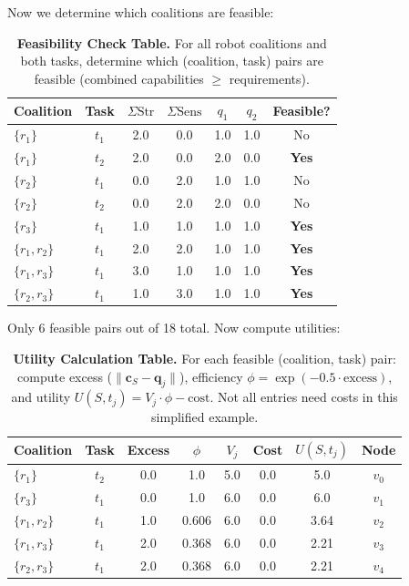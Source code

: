 Now we determine which coalitions are feasible:

\begin{table}[H]
\centering
\begin{tabular}{lcccccc}
\toprule
\textbf{Coalition} & \textbf{Task} & $\Sigma \text{Str}$ & $\Sigma \text{Sens}$ & $q_1$ & $q_2$ & \textbf{Feasible?} \\
\midrule
$\{r_1\}$ & $t_1$ & 2.0 & 0.0 & 1.0 & 1.0 & No \\
$\{r_1\}$ & $t_2$ & 2.0 & 0.0 & 2.0 & 0.0 & \textbf{Yes} \\
$\{r_2\}$ & $t_1$ & 0.0 & 2.0 & 1.0 & 1.0 & No \\
$\{r_2\}$ & $t_2$ & 0.0 & 2.0 & 2.0 & 0.0 & No \\
$\{r_3\}$ & $t_1$ & 1.0 & 1.0 & 1.0 & 1.0 & \textbf{Yes} \\
$\{r_1, r_2\}$ & $t_1$ & 2.0 & 2.0 & 1.0 & 1.0 & \textbf{Yes} \\
$\{r_1, r_3\}$ & $t_1$ & 3.0 & 1.0 & 1.0 & 1.0 & \textbf{Yes} \\
$\{r_2, r_3\}$ & $t_1$ & 1.0 & 3.0 & 1.0 & 1.0 & \textbf{Yes} \\
\bottomrule
\end{tabular}
\caption{\textbf{Feasibility Check Table.} For all robot coalitions and both tasks, determine which (coalition, task) pairs are feasible (combined capabilities $\geq$ requirements).}
\label{tab:feasibility-check}
\end{table}

Only 6 feasible pairs out of 18 total. Now compute utilities:

\begin{table}[H]
\centering
\small
\begin{tabular}{lccccccc}
\toprule
\textbf{Coalition} & \textbf{Task} & \textbf{Excess} & $\phi$ & $V_j$ & \textbf{Cost} & $U(S,t_j)$ & \textbf{Node} \\
\midrule
$\{r_1\}$ & $t_2$ & 0.0 & 1.0 & 5.0 & 0.0 & 5.0 & $v_0$ \\
$\{r_3\}$ & $t_1$ & 0.0 & 1.0 & 6.0 & 0.0 & 6.0 & $v_1$ \\
$\{r_1, r_2\}$ & $t_1$ & 1.0 & 0.606 & 6.0 & 0.0 & 3.64 & $v_2$ \\
$\{r_1, r_3\}$ & $t_1$ & 2.0 & 0.368 & 6.0 & 0.0 & 2.21 & $v_3$ \\
$\{r_2, r_3\}$ & $t_1$ & 2.0 & 0.368 & 6.0 & 0.0 & 2.21 & $v_4$ \\
\bottomrule
\end{tabular}
\caption{\textbf{Utility Calculation Table.} For each feasible (coalition, task) pair: compute excess ($\|\mathbf{c}_S - \mathbf{q}_j\|$), efficiency $\phi = \exp(-0.5 \cdot \text{excess})$, and utility $U(S, t_j) = V_j \cdot \phi - \text{cost}$. Not all entries need costs in this simplified example.}
\label{tab:utility-table}
\end{table}

